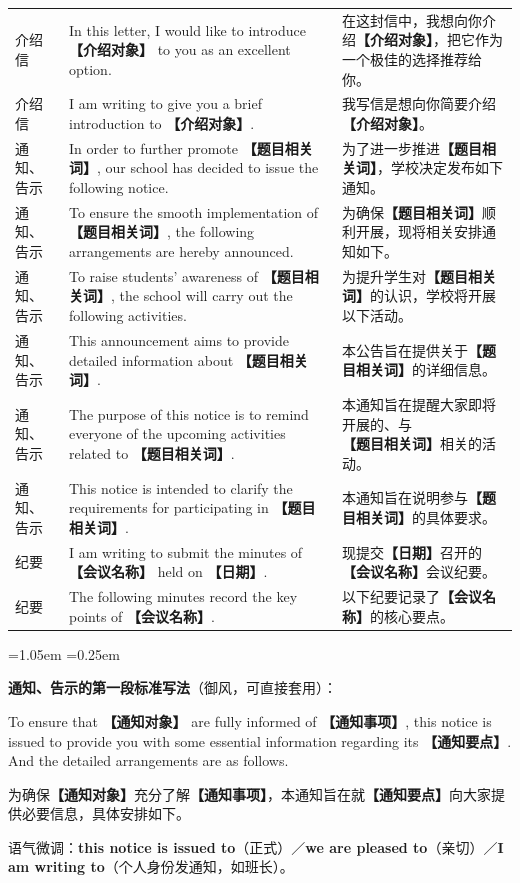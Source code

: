 \documentclass[11pt,a4paper]{ctexart}
\newcommand{\fillin}[1]{{\bfseries【#1】}}
\newcommand{\kw}[1]{{\bfseries\color{accent}#1}}
\newenvironment{note}{%
  \par\addvspace{5pt}%
  \begin{list}{}{\leftmargin=1.05em \rightmargin=0.25em \listparindent=0pt
    \itemindent=0pt \topsep=0pt \parsep=2pt \itemsep=2pt \partopsep=0pt}%
  \item\relax\small\color{ink}%
}{%
  \end{list}\addvspace{5pt}%
}
\begin{document}
\begin{longtable}{L{2.0cm}L{9.2cm}L{4.6cm}}
介绍信 & In this letter, I would like to introduce \fillin{介绍对象} to you as an excellent option. & 在这封信中，我想向你介绍\fillin{介绍对象}，把它作为一个极佳的选择推荐给你。 \\
介绍信 & I am writing to give you a brief introduction to \fillin{介绍对象}. & 我写信是想向你简要介绍\fillin{介绍对象}。 \\
\midrule

通知、告示 & In order to further promote \fillin{题目相关词}, our school has decided to issue the following notice. & 为了进一步推进\fillin{题目相关词}，学校决定发布如下通知。 \\
通知、告示 & To ensure the smooth implementation of \fillin{题目相关词}, the following arrangements are hereby announced. & 为确保\fillin{题目相关词}顺利开展，现将相关安排通知如下。 \\
通知、告示 & To raise students' awareness of \fillin{题目相关词}, the school will carry out the following activities. & 为提升学生对\fillin{题目相关词}的认识，学校将开展以下活动。 \\
通知、告示 & This announcement aims to provide detailed information about \fillin{题目相关词}. & 本公告旨在提供关于\fillin{题目相关词}的详细信息。 \\
通知、告示 & The purpose of this notice is to remind everyone of the upcoming activities related to \fillin{题目相关词}. & 本通知旨在提醒大家即将开展的、与\fillin{题目相关词}相关的活动。 \\
通知、告示 & This notice is intended to clarify the requirements for participating in \fillin{题目相关词}. & 本通知旨在说明参与\fillin{题目相关词}的具体要求。 \\
\midrule

纪要 & I am writing to submit the minutes of \fillin{会议名称} held on \fillin{日期}. & 现提交\fillin{日期}召开的\fillin{会议名称}会议纪要。 \\
纪要 & The following minutes record the key points of \fillin{会议名称}. & 以下纪要记录了\fillin{会议名称}的核心要点。 \\

\end{longtable}

\begin{note}
\textbf{通知、告示的第一段标准写法}（御风，可直接套用）：\par
To ensure that \fillin{通知对象} are fully informed of \fillin{通知事项}, this notice is issued to provide you with some essential information regarding its \fillin{通知要点}. And the detailed arrangements are as follows.\par
为确保\fillin{通知对象}充分了解\fillin{通知事项}，本通知旨在就\fillin{通知要点}向大家提供必要信息，具体安排如下。\par
语气微调：\kw{this notice is issued to}（正式）／\kw{we are pleased to}（亲切）／\kw{I am writing to}（个人身份发通知，如班长）。
\end{note}
\end{document}
